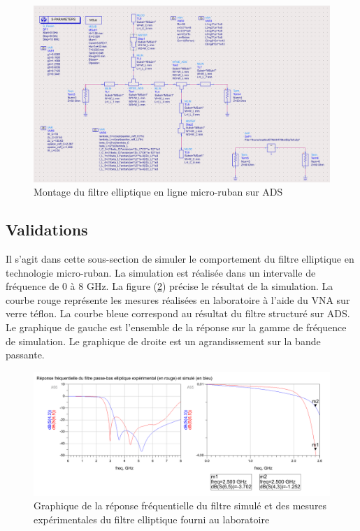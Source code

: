 \documentclass[french]{article}
\begin{document}
\begin{figure}[H]
	\centering
	\includegraphics[width=14cm]{../3synthPBas/elliptique/modele_microstrip_ADS.png}
	\caption{Montage du filtre elliptique en ligne micro-ruban sur ADS}
	\label{fig:structure_elliptique_microstrip}
\end{figure}

\newpage

\subsection*{Validations}

Il s'agit dans cette sous-section de simuler le comportement du filtre elliptique en technologie micro-ruban. La simulation est réalisée dans un intervalle de fréquence de 0 à 8 GHz. La figure (\ref{fig:resultat_elliptique_microstrip}) précise le résultat de la simulation. La courbe rouge représente les mesures réalisées en laboratoire à l'aide du VNA sur verre téflon. La courbe bleue correspond au résultat du filtre structuré sur ADS. Le graphique de gauche est l'ensemble de la réponse sur la gamme de fréquence de simulation. Le graphique de droite est un agrandissement sur la bande passante.


\begin{figure}[H]
	\centering
	\includegraphics[width=16cm]{../3synthPBas/elliptique/resultat_simu_microstrip.png}
	\caption{Graphique de la réponse fréquentielle du filtre simulé et des mesures expérimentales du filtre elliptique fourni au laboratoire}
	\label{fig:resultat_elliptique_microstrip}
\end{figure}
\end{document}
